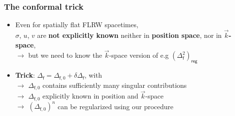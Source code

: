 \documentclass[9pt]{beamer}
\newcommand{\fsf}{\mathsf{f}}
\begin{document}
\begin{frame}

\frametitle{The conformal trick} 

\begin{itemize}


\item \textdbend \quad Even for spatially flat FLRW spacetimes, \\
$\sigma$, $u$, $v$ are \textbf{not explicitly known} neither in \textbf{position space}, nor in \textbf{$\vec{k}$-space}, \\
$\to$ but we need to know the $\vec{k}$-space version of e.g $\left( \Delta^2_\fsf \right)_\mathsf{reg}$
\vspace*{20pt}

\item \textbf{Trick}: $\Delta_\fsf=\Delta_{\fsf,0}+\delta \Delta_\fsf$, with \\[3pt]

$\to$ $\Delta_{\fsf,0}$ contains sufficiently many singular contributions \\[3pt]

$\to$ $\Delta_{\fsf,0}$ explicitly known in position and $\vec{k}$-space \\[3pt]

$\to$ $(\Delta_{\fsf,0})^n$ can be regularized using our procedure

\end{itemize}




\end{frame}

\end{document}
